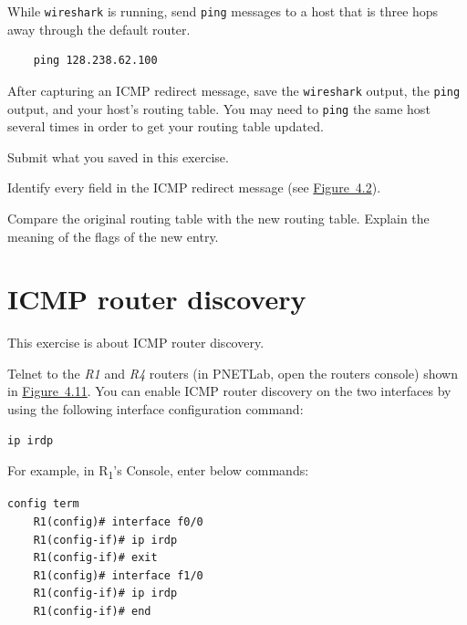 \documentclass{UTNetLab}
\begin{document}
    While \lstinline{wireshark} is running, send \lstinline{ping} messages to a host that is three hops away through the default router.
    
    \begin{lstlisting}
    ping 128.238.62.100
    \end{lstlisting}

    After capturing an ICMP redirect message, save the \lstinline{wireshark} output, the \lstinline{ping} output, and your host’s routing table.
    You may need to \lstinline{ping} the same host several times in order to get your routing table updated.
    
    \begin{report}
        \item Submit what you saved in this exercise.
        
        \item Identify every field in the ICMP redirect message (see \hyperref[fig:4.2]{Figure~4.2}).
        
        \item Compare the original routing table with the new routing table. Explain the meaning of the flags of the new entry.
    \end{report}

\section{ICMP router discovery}\label{sec:ICMPRD}
    This exercise is about ICMP router discovery.
    
    Telnet to the \textit{R1} and \textit{R4} routers (in PNETLab, open the routers console) shown in \hyperref[fig:4.11]{Figure~4.11}.
    You can enable ICMP router discovery on the two interfaces by using the following interface configuration command:

    
    \begin{lstlisting}[frame=trBL, language=cisco]
    ip irdp
    \end{lstlisting}

For example, in R\textsubscript{1}'s Console, enter below commands:

    \begin{lstlisting}[frame=trBL, language=cisco]
    config term
    R1(config)# interface f0/0
    R1(config-if)# ip irdp
    R1(config-if)# exit
    R1(config)# interface f1/0
    R1(config-if)# ip irdp
    R1(config-if)# end
\end{lstlisting}
\end{document}
